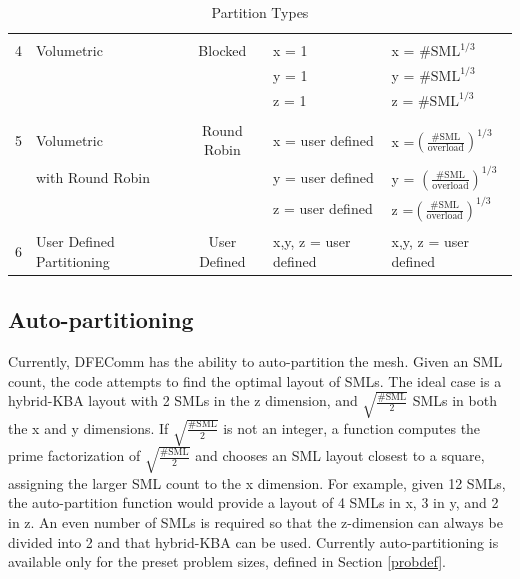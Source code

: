 \documentclass{article}
\begin{document}
\begin{table}[H]
\begin{center}
\begin{tabular}{ |c| p{4cm}| c| p{3cm}| p{3.0cm}|}
    \hline& & & &\\ [-1.5ex]
    4 & Volumetric & Blocked  & x = 1 & x = $\text{\# SML}^{1/3}$ \\  
     &  && y = 1  & y = $\text{\# SML}^{1/3}$ \\  
     & & & z = 1 & z = $\text{\# SML}^{1/3}$\\
    \hline& & & &\\ [-1.5ex]
    5 & Volumetric & Round Robin  & x = user defined & x =$\left(\frac{\text{\# SML}}{\text{overload}}\right)^{1/3}$ \\  
     & with Round Robin && y = user defined  & y = $\left(\frac{\text{\# SML}}{\text{overload}}\right)^{1/3}$ \\  
     & & & z = user defined & z =$\left(\frac{\text{\# SML}}{\text{overload}}\right)^{1/3}$\\
      \hline& & & &\\ [-1.5ex]
    6 & User Defined Partitioning &User Defined& \multicolumn{1}{l|}{x,y, z = user defined } & \multicolumn{1}{l|}{x,y, z = user defined }\\  
    \hline
  \end{tabular} 
  
      \caption{Partition Types}
      \label{table::partition}
\end{center}
\end{table}


 \subsection{Auto-partitioning}
Currently, DFEComm has the ability to auto-partition the mesh. Given an SML count, the code attempts to find the optimal layout of SMLs. The ideal case is a hybrid-KBA layout with 2 SMLs in the z dimension, and $\sqrt{\frac{\# \text{SML}}{2}}$ SMLs in both the x and y dimensions. If $\sqrt{\frac{\# \text{SML}}{2}}$ is not an integer, a function computes the prime factorization of $\sqrt{\frac{\# \text{SML}}{2}}$ and chooses an SML layout closest to a square, assigning the larger SML count to the x dimension. For example, given 12 SMLs, the auto-partition function would provide a layout of 4 SMLs in x, 3 in y, and 2 in z. An even number of SMLs is required so that the z-dimension can always be divided into 2 and that hybrid-KBA can be used. Currently auto-partitioning is available only for the preset problem sizes, defined in Section \ref{probdef}.

\end{document}
